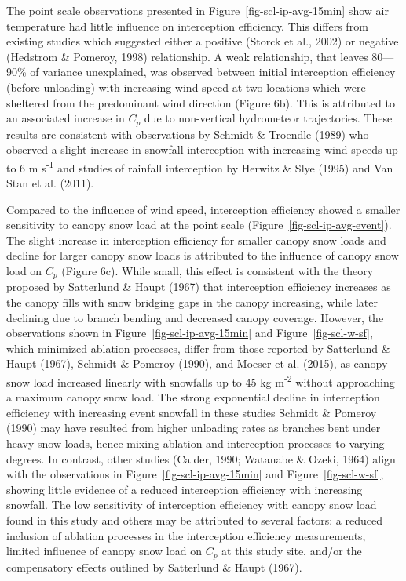 \documentclass[
  letterpaper,
  DIV=11,
  numbers=noendperiod]{scrartcl}
\begin{document}
The point scale observations presented in
Figure~\ref{fig-scl-ip-avg-15min} show air temperature had little
influence on interception efficiency. This differs from existing studies
which suggested either a positive (Storck et al., 2002) or negative
(Hedstrom \& Pomeroy, 1998) relationship. A weak relationship, that
leaves 80---90\% of variance unexplained, was observed between initial
interception efficiency (before unloading) with increasing wind speed at
two locations which were sheltered from the predominant wind direction
(Figure 6b). This is attributed to an associated increase in \(C_p\) due
to non-vertical hydrometeor trajectories. These results are consistent
with observations by Schmidt \& Troendle (1989) who observed a slight
increase in snowfall interception with increasing wind speeds up to 6 m
s\textsuperscript{-1} and studies of rainfall interception by Herwitz \&
Slye (1995) and Van Stan et al. (2011).

Compared to the influence of wind speed, interception efficiency showed
a smaller sensitivity to canopy snow load at the point scale
(Figure~\ref{fig-scl-ip-avg-event}). The slight increase in interception
efficiency for smaller canopy snow loads and decline for larger canopy
snow loads is attributed to the influence of canopy snow load on \(C_p\)
(Figure 6c). While small, this effect is consistent with the theory
proposed by Satterlund \& Haupt (1967) that interception efficiency
increases as the canopy fills with snow bridging gaps in the canopy
increasing, while later declining due to branch bending and decreased
canopy coverage. However, the observations shown in
Figure~\ref{fig-scl-ip-avg-15min} and Figure~\ref{fig-scl-w-sf}, which
minimized ablation processes, differ from those reported by Satterlund
\& Haupt (1967), Schmidt \& Pomeroy (1990), and Moeser et al. (2015), as
canopy snow load increased linearly with snowfalls up to 45 kg
m\textsuperscript{-2} without approaching a maximum canopy snow load.
The strong exponential decline in interception efficiency with
increasing event snowfall in these studies Schmidt \& Pomeroy (1990) may
have resulted from higher unloading rates as branches bent under heavy
snow loads, hence mixing ablation and interception processes to varying
degrees. In contrast, other studies (Calder, 1990; Watanabe \& Ozeki,
1964) align with the observations in Figure~\ref{fig-scl-ip-avg-15min}
and Figure~\ref{fig-scl-w-sf}, showing little evidence of a reduced
interception efficiency with increasing snowfall. The low sensitivity of
interception efficiency with canopy snow load found in this study and
others may be attributed to several factors: a reduced inclusion of
ablation processes in the interception efficiency measurements, limited
influence of canopy snow load on \(C_p\) at this study site, and/or the
compensatory effects outlined by Satterlund \& Haupt (1967).
\end{document}

